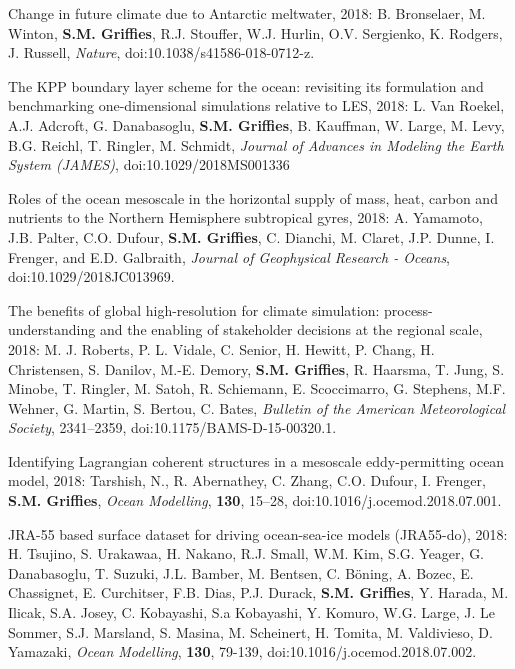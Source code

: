 \begin{etaremune}
\item Change in future climate due to Antarctic meltwater, 2018: B. Bronselaer, M. Winton, {\bf S.M. Grif\/f\/ies}, R.J. Stouffer, W.J. Hurlin, O.V. Sergienko, K. Rodgers, J. Russell, {\it  Nature}, doi:10.1038/s41586-018-0712-z.

\item The KPP boundary layer scheme for the ocean: revisiting its formulation and benchmarking one-dimensional simulations relative to LES,  2018: L. Van Roekel, A.J.  Adcroft, G. Danabasoglu, {\bf S.M. Grif\/f\/ies}, B. Kauffman, W. Large, M. Levy, B.G. Reichl, T. Ringler, M. Schmidt, {\it Journal of Advances in Modeling the Earth System (JAMES)}, doi:10.1029/2018MS001336

\item Roles of the ocean mesoscale in the horizontal supply of mass, heat, carbon and nutrients to the Northern Hemisphere subtropical gyres, 2018: A. Yamamoto, J.B. Palter, C.O. Dufour, {\bf S.M. Grif\/f\/ies}, C. Dianchi, M. Claret, J.P. Dunne, I. Frenger, and E.D. Galbraith, {\it Journal of Geophysical Research - Oceans},  doi:10.1029/2018JC013969.


\item The benefits of global high-resolution for climate simulation: process-understanding and the enabling of stakeholder decisions at the regional scale, 2018: M. J. Roberts, P. L. Vidale, C. Senior, H. Hewitt, P. Chang, H. Christensen, S. Danilov, M.-E. Demory, {\bf S.M. Grif\/f\/ies}, R. Haarsma, T. Jung, S. Minobe, T. Ringler, M. Satoh, R. Schiemann, E. Scoccimarro, G. Stephens, M.F. Wehner, G. Martin, S. Bertou, C. Bates, {\it Bulletin of the American Meteorological Society}, 2341--2359, doi:10.1175/BAMS-D-15-00320.1. 



\item Identifying Lagrangian coherent structures in a mesoscale eddy-permitting ocean model, 2018: Tarshish, N., R. Abernathey, C. Zhang, C.O. Dufour, I. Frenger, {\bf S.M. Grif\/f\/ies}, \textit{Ocean Modelling}, {\bf 130}, 15--28, doi:10.1016/j.ocemod.2018.07.001.

\item JRA-55 based surface dataset for driving ocean-sea-ice models (JRA55-do), 2018: H. Tsujino, S. Urakawaa, H. Nakano, R.J. Small, W.M. Kim, S.G. Yeager, G. Danabasoglu, T. Suzuki, J.L. Bamber, M. Bentsen, C. {B\"{o}ning}, A. Bozec, E. Chassignet, E. Curchitser, F.B. Dias, P.J. Durack, {\bf S.M. Grif\/f\/ies}, Y. Harada, M. Ilicak, S.A. Josey, C. Kobayashi, S.a Kobayashi, Y. Komuro, W.G. Large, J. {Le Sommer}, S.J. Marsland, S. Masina, M. Scheinert, H. Tomita, M. Valdivieso, D. Yamazaki, {\it Ocean Modelling},  {\bf 130}, 79-139, doi:10.1016/j.ocemod.2018.07.002.


\end{etaremune}
